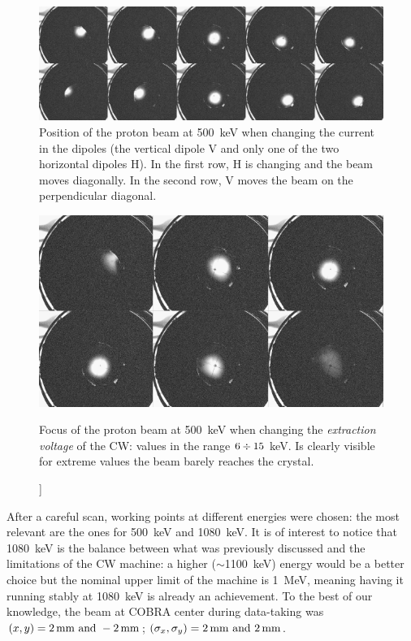 \begin{refsection}
        \begin{figure}
            \centering
            \includegraphics[width = \textwidth]{Figures/X17/beamtuning/psotion_500keV.png}
            \caption[X17: beam position tuning]{Position of the proton beam at \SI{500}{keV} when changing the current in the dipoles (the vertical dipole V and only one of the two horizontal dipoles H). In the first row, H is changing and the beam moves diagonally. In the second row, V moves the beam on the perpendicular diagonal.}
            \label{fig:position_500keV}
        \end{figure}
        \begin{figure}
            \centering
            \includegraphics[width = \textwidth]{Figures/X17/beamtuning/focus_500keV.png}
            \caption[X17: beam focus tuning]]{Focus of the proton beam at \SI{500}{keV} when changing the \textit{extraction voltage} of the CW: values in the range $6\divisionsymbol15$ keV. Is clearly visible for extreme values the beam barely reaches the crystal.}
            \label{fig:focus_500keV}
        \end{figure}
        \noindent
        After a careful scan, working points at different energies were chosen: the most relevant are the ones for \SI{500}{keV} and \SI{1080}{keV}.
        It is of interest to notice that \SI{1080}{keV} is the balance between what was previously discussed and the limitations of the CW machine: a higher ($\sim$\SI{1100}{keV}) energy would be a better choice but the nominal upper limit of the machine is \SI{1}{MeV}, meaning having it running stably at \SI{1080}{keV} is already an achievement.
        To the best of our knowledge, the beam at COBRA center during data-taking was $(x, y) = \SIlist{2; -2}{mm}$; $(\sigma_x, \sigma_y) = \SIlist{2; 2}{mm}$.\\


\end{refsection}

